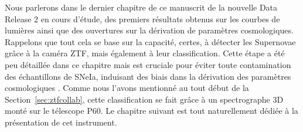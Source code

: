 \documentclass[../main/main.tex]{subfiles}
\begin{document}
Nous parlerons dans le dernier chapitre de ce manuscrit de la nouvelle
Data Release 2 en cours d'étude, des premiers résultats obtenus sur les courbes de
lumières ainsi que des ouvertures sur la dérivation de paramètres
cosmologiques. Rappelons que tout cela se base sur la capacité, certes, à
détecter les Supernovae grâce à la caméra ZTF, mais également à leur
classification. Cette étape a été peu détaillée dans ce chapitre mais
est cruciale pour éviter toute contamination des échantillons de SNeIa,
induisant des biais dans la dérivation des paramètres cosmologiques
\citep{JonesScolnic17SNcontam}. Comme nous l'avons mentionné au tout
début de la Section~\ref{sec:ztfcollab}, cette classification se fait
grâce à un spectrographe 3D monté sur le télescope P60. Le chapitre
suivant est tout naturellement dédiée à la présentation de cet
instrument.


%
%
\end{document}
